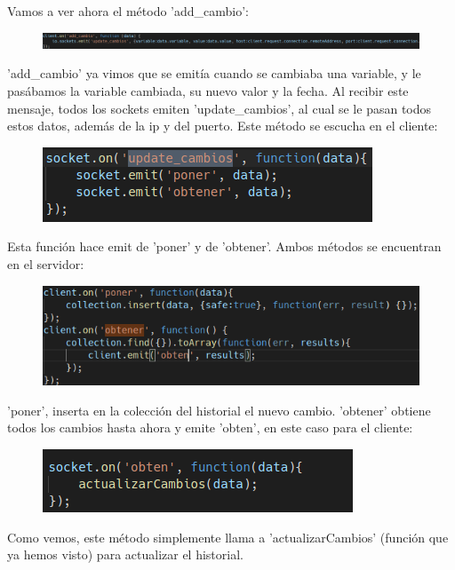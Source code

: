 \documentclass{article}
\begin{document}
	Vamos a ver ahora el método 'add\_cambio':
	\begin{figure}[H]
		\centering
		\includegraphics[totalheight=0.55cm]{img/25.png}
	\end{figure}
	'add\_cambio' ya vimos que se emitía cuando se cambiaba una variable, y le pasábamos la variable cambiada, su nuevo valor y la fecha. Al recibir este mensaje, todos los sockets emiten 'update\_cambios', al cual se le pasan todos estos datos, además de la ip y del puerto. Este método se escucha en el cliente:
	\begin{figure}[H]
		\centering
		\includegraphics[totalheight=2.9cm]{img/26.png}
	\end{figure}
	Esta función hace emit de 'poner' y de 'obtener'. Ambos métodos se encuentran en el servidor:
	\begin{figure}[H]
		\centering
		\includegraphics[totalheight=3.3cm]{img/27.png}
	\end{figure}
	'poner', inserta en la colección del historial el nuevo cambio. 'obtener' obtiene todos los cambios hasta ahora y emite 'obten', en este caso para el cliente:
	\begin{figure}[H]
		\centering
		\includegraphics[totalheight=2.5cm]{img/28.png}
	\end{figure}
	Como vemos, este método simplemente llama a 'actualizarCambios' (función que ya hemos visto) para actualizar el historial.
\end{document}

